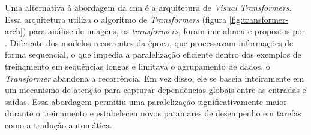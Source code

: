 Uma alternativa à abordagem da \gls{cnn} é a arquitetura de \textit{Visual Transformers}. Essa arquitetura utiliza o algoritmo de \textit{Transformers} (figura \ref{fig:transformer-arch}) para análise de imagens, os \textit{transformers}, foram inicialmente propostos por . Diferente dos modelos recorrentes da época, que processavam informações de forma sequencial, o que impedia a paralelização eficiente dentro dos exemplos de treinamento em sequências longas e limitava o agrupamento de dados, o \textit{Transformer} abandona a recorrência. Em vez disso, ele se baseia inteiramente em um mecanismo de atenção para capturar dependências globais entre as entradas e saídas. 
Essa abordagem permitiu uma paralelização significativamente maior durante o treinamento e estabeleceu novos patamares de desempenho em tarefas como a tradução automática.


